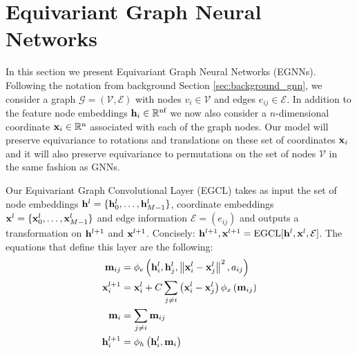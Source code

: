 \section{Equivariant Graph Neural Networks} 

\label{sec:method_main}
In this section we present Equivariant Graph Neural Networks (EGNNs). Following the notation from background Section \ref{sec:background_gnn}, we consider a graph $\mathcal{G} = (\mathcal{V},\mathcal{E})$ with nodes $v_i \in \mathcal{V}$ and edges $e_{ij} \in \mathcal{E}$. In addition to the feature node embeddings $\mathbf{h}_i \in \mathbb{R}^{\text{nf}}$ we now also consider a $n$-dimensional coordinate $\mathbf{x}_i \in  \mathbb{R}^{\text{n}}$ associated with each of the graph nodes. Our model will preserve equivariance to rotations and translations on these set of coordinates $\mathbf{x}_i$ and it will also preserve equivariance to permutations on the set of nodes $\mathcal{V}$ in the same fashion as GNNs.



Our Equivariant Graph Convolutional Layer (EGCL) takes as input the set of node embeddings $\mathbf{h}^l =\{\mathbf{h}_0^l, \dots, \mathbf{h}_{M-1}^l\}$, coordinate embeddings $\mathbf{x}^l =\{\mathbf{x}_0^l, \dots, \mathbf{x}_{M-1}^l\} $ and edge information $\mathcal{E}=(e_{ij})$ and outputs a transformation on $\mathbf{h}^{l+1}$ and $\mathbf{x}^{l+1}$. Concisely: $\mathbf{h}^{l+1}, \mathbf{x}^{l+1} = \text{EGCL}[\mathbf{h}^{l}, \mathbf{x}^{l}, \mathcal{E}]$. The equations that define this layer are the following:
\begin{align}\label{eq:method_edge}
\mathbf{m}_{ij} &=\phi_{e}\left(\mathbf{h}_{i}^{l}, \mathbf{h}_{j}^{l},\left\|\mathbf{x}_{i}^{l}-\mathbf{x}_{j}^{l}\right\|^{2}, a_{i j}\right) \\ \label{eq:method_coords}
\mathbf{x}_{i}^{l+1} &=\mathbf{x}_{i}^{l}+ C\sum_{j \neq i}\left(\mathbf{x}_{i}^{l}-\mathbf{x}_{j}^{l}\right) \phi_{x}\left(\mathbf{m}_{ij}\right) \\
 \label{eq:method_agg}
\mathbf{m}_{i} &=\sum_{j \neq i} \mathbf{m}_{ij} \\ 
\label{eq:method_node}
\mathbf{h}_{i}^{l+1} &=\phi_{h}\left(\mathbf{h}_{i}^l, \mathbf{m}_{i}\right)
\end{align}

